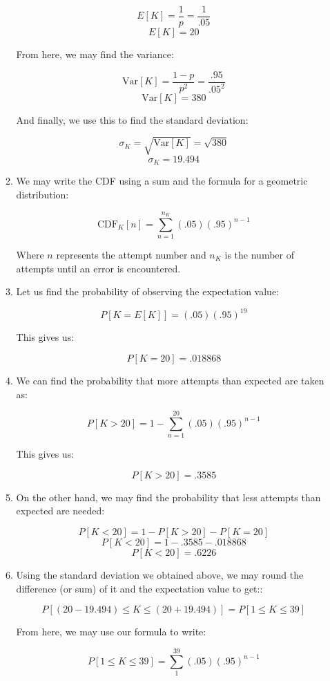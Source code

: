 \begin{enumerate}
\begin{enumerate}
        $$E[K]=\frac{1}{p}=\frac{1}{.05}$$
        $$\boxed{E[K]=20}$$

        From here, we may find the variance:

        $$\text{Var}[K]=\frac{1-p}{p^2}=\frac{.95}{.05^2}$$
        $$\boxed{\text{Var}[K]=380}$$

        And finally, we use this to find the standard deviation:

        $$\sigma_K=\sqrt{\text{Var}[K]}=\sqrt{380}$$
        $$\boxed{\sigma_K=19.494}$$

      \item We may write the CDF using a sum and the formula for a geometric distribution:

        $$\boxed{\text{CDF}_K[n]=\sum_{n=1}^{n_K}(.05)(.95)^{n-1}}$$

        Where $n$ represents the attempt number and $n_K$ is the number of attempts until an error is encountered.

      \item Let us find the probability of observing the expectation value:

        $$P[K=E[K]]=(.05)(.95)^{19}$$

        This gives us:

        $$\boxed{P[K=20]=.018868}$$

      \item We can find the probability that more attempts than expected are taken as:

        $$P[K>20]=1-\sum_{n=1}^{20}(.05)(.95)^{n-1}$$

        This gives us:

        $$\boxed{P[K>20]=.3585}$$

      \item On the other hand, we may find the probability that less attempts than expected are needed:

        $$P[K<20]=1-P[K>20]-P[K=20]$$
        $$P[K<20]=1-.3585-.018868$$
        $$\boxed{P[K<20]=.6226}$$

      \item Using the standard deviation we obtained above, we may round the difference (or sum) of it and the expectation value to get::

        $$P[(20-19.494)\leq K \leq (20+19.494)]=P[1\leq K\leq 39]$$

        From here, we may use our formula to write:

        $$P[1\leq K\leq 39]=\sum_{1}^{39} (.05)(.95)^{n-1}$$


\end{enumerate}
\end{enumerate}
